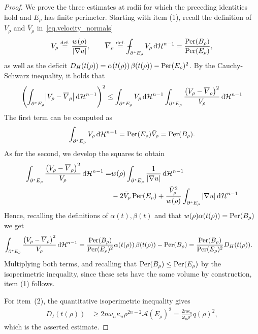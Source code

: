 \documentclass[11pt]{amsart}
\theoremstyle{plain}
\theoremstyle{definition}
\def\Xint#1{\mathchoice{\XXint\displaystyle\textstyle{#1}}%
  {\XXint\textstyle\scriptstyle{#1}}%
  {\XXint\scriptstyle\scriptscriptstyle{#1}}%
  {\XXint\scriptscriptstyle\scriptscriptstyle{#1}}%
  \!\int}
\def\XXint#1#2#3{{\setbox0=\hbox{$#1{#2#3}{\int}$}
  \vcenter{\hbox{$#2#3$}}\kern-.5\wd0}}
\def\fint{\Xint-}
\newcommand{\dHn}{\,\dd\mathcal{H}^{n-1}}
\newcommand{\eqdef}{\overset{\text{def.}}{=}}
\def\dd{{\rm d}}
\newcommand\Per{\mathop{\rm Per}}
\begin{document}
\begin{proof}
We prove the three estimates at radii for which the preceding identities hold and $E_\rho$ has finite perimeter. Starting with item (1), recall the definition of $V_\rho$ and $\overline{V}_\rho$ in~\eqref{eq.velocity_normals}
\[
  V_\rho\eqdef\frac{w(\rho)}{|\nabla u|},\qquad
  \overline{V}_\rho\eqdef\fint_{\partial^*E_\rho}V_\rho\dHn=\frac{\Per(B_\rho)}{\Per(E_\rho)},
\]
as well as the deficit $D_H(t(\rho))=\alpha(t(\rho))\,\beta(t(\rho))-\Per(E_\rho)^2$. By the Cauchy-Schwarz inequality, it holds that
\begin{align*}
  \left(\int_{\partial^*E_\rho}
  \bigl|V_\rho-\overline{V}_\rho\bigr|\dHn\right)^{2}
  \le
  \int_{\partial^*E_\rho}V_\rho\dHn
  \int_{\partial^*E_\rho}\frac{\bigl(V_\rho-\overline{V}_\rho\bigr)^2}{V_\rho}\dHn
\end{align*}
The first term can be computed as
\[
  \int_{\partial^*E_\rho}V_\rho\dHn = \Per(E_\rho) \bar V_\rho = \Per(B_\rho).
\]
As for the second, we develop the squares to obtain
  \begin{align*}
  \int_{\partial^*E_\rho}\frac{\bigl(V_\rho-\overline{V}_\rho\bigr)^2}{V_\rho}\dHn
  = &
  w(\rho)\int_{\partial^* E_\rho} \frac{1}{|\nabla u|} \dHn\\
  & 
  -2\bar V_\rho \Per(E_\rho)
  +
  \frac{\bar V_\rho^2}{w(\rho)} \int_{\partial^* E_\rho}|\nabla u| \dHn
\end{align*}
Hence, recalling the definitions of $\alpha(t), \beta(t)$ and that $w(\rho)\alpha(t(\rho))=\Per(B_\rho)$ we get
\begin{align*}
    \int_{\partial^*E_\rho}\frac{\bigl(V_\rho-\overline{V}_\rho\bigr)^2}{V_\rho}\dHn
    &=\frac{\Per(B_\rho)}{\Per(E_\rho)^2} \alpha(t(\rho))\,\beta(t(\rho))-\Per(B_\rho)
    =\frac{\Per(B_\rho)}{\Per(E_\rho)^2} D_H(t(\rho)).
\end{align*}
Multiplying both terms, and recalling that $\Per(B_\rho) \le \Per(E_\rho)$
by the isoperimetric inequality, since these sets have the same volume by construction, item (1) follows.

For item~(2), the quantitative isoperimetric inequality gives
\begin{align*}
 D_I(t(\rho))
 &\ge 2n\omega_n\kappa_n\rho^{2n-2}\mathcal A(E_\rho)^2
 =\frac{2n\kappa_n}{\omega_n\rho^2}q(\rho)^2,
\end{align*}
which is the asserted estimate.


\end{proof}
\end{document}
